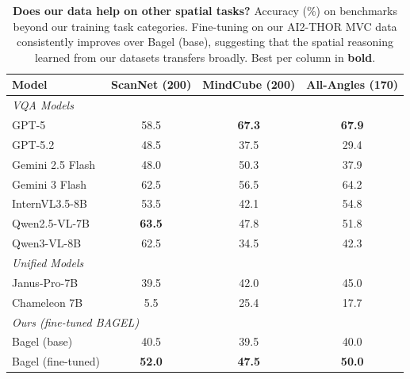\begin{table}[t]
  \caption{\textbf{Does our data help on other spatial tasks?} Accuracy (\%) on benchmarks beyond our training task categories. Fine-tuning on our AI2-THOR MVC data consistently improves over Bagel (base), suggesting that the spatial reasoning learned from our datasets transfers broadly. Best per column in \textbf{bold}.}
  \vspace{-1em}
  \centering
  \setlength{\tabcolsep}{4pt}
  \small
  \begin{tabular}{l ccc}
    \toprule
    \textbf{Model}
      & \footnotesize ScanNet (200)
      & \footnotesize MindCube (200)
      & \footnotesize All-Angles (170) \\
    \midrule
    \multicolumn{4}{l}{\emph{VQA Models}} \\
    GPT-5            & 58.5 & \textbf{67.3} & \textbf{67.9} \\
    GPT-5.2          & 48.5 & 37.5 & 29.4 \\
    Gemini 2.5 Flash & 48.0 & 50.3 & 37.9 \\
    Gemini 3 Flash   & 62.5 & 56.5 & 64.2 \\
    InternVL3.5-8B   & 53.5 & 42.1 & 54.8 \\
    Qwen2.5-VL-7B   & \textbf{63.5} & 47.8 & 51.8 \\
    Qwen3-VL-8B     & 62.5 & 34.5 & 42.3 \\
    \midrule
    \multicolumn{4}{l}{\emph{Unified Models}} \\
    Janus-Pro-7B     & 39.5 & 42.0 & 45.0 \\
    Chameleon 7B     & 5.5 & 25.4 & 17.7 \\
    \midrule
    \multicolumn{4}{l}{\emph{Ours (fine-tuned BAGEL)}} \\
    Bagel (base)       & 40.5 & 39.5 & 40.0 \\
    Bagel (fine-tuned) & \textbf{52.0} & \textbf{47.5} & \textbf{50.0} \\
    \bottomrule
  \end{tabular}
  \label{tab:ablation_data}
\end{table}
